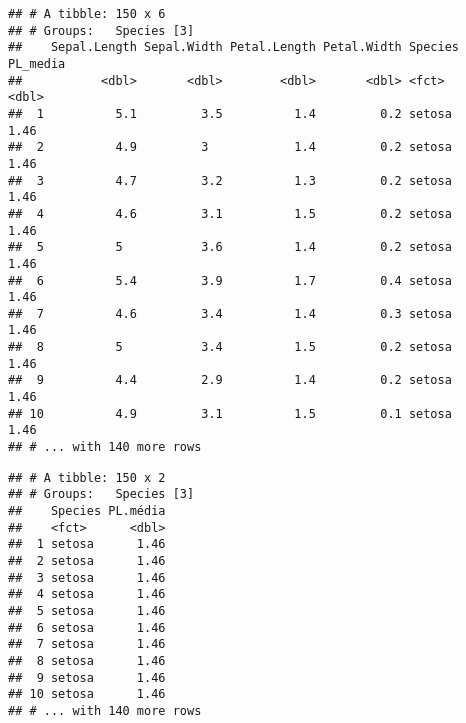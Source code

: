 \documentclass[]{book}
\newenvironment{Shaded}{\begin{snugshade}}{\end{snugshade}}
\newcommand{\DataTypeTok}[1]{\textcolor[rgb]{0.13,0.29,0.53}{#1}}
\newcommand{\KeywordTok}[1]{\textcolor[rgb]{0.13,0.29,0.53}{\textbf{#1}}}
\newcommand{\NormalTok}[1]{#1}
\newcommand{\OperatorTok}[1]{\textcolor[rgb]{0.81,0.36,0.00}{\textbf{#1}}}
\newcommand{\StringTok}[1]{\textcolor[rgb]{0.31,0.60,0.02}{#1}}
\begin{document}
\begin{Shaded}
\end{Shaded}

\begin{verbatim}
## # A tibble: 150 x 6
## # Groups:   Species [3]
##    Sepal.Length Sepal.Width Petal.Length Petal.Width Species PL_media
##           <dbl>       <dbl>        <dbl>       <dbl> <fct>      <dbl>
##  1          5.1         3.5          1.4         0.2 setosa      1.46
##  2          4.9         3            1.4         0.2 setosa      1.46
##  3          4.7         3.2          1.3         0.2 setosa      1.46
##  4          4.6         3.1          1.5         0.2 setosa      1.46
##  5          5           3.6          1.4         0.2 setosa      1.46
##  6          5.4         3.9          1.7         0.4 setosa      1.46
##  7          4.6         3.4          1.4         0.3 setosa      1.46
##  8          5           3.4          1.5         0.2 setosa      1.46
##  9          4.4         2.9          1.4         0.2 setosa      1.46
## 10          4.9         3.1          1.5         0.1 setosa      1.46
## # ... with 140 more rows
\end{verbatim}

\begin{Shaded}
\end{Shaded}

\begin{verbatim}
## # A tibble: 150 x 2
## # Groups:   Species [3]
##    Species PL.média
##    <fct>      <dbl>
##  1 setosa      1.46
##  2 setosa      1.46
##  3 setosa      1.46
##  4 setosa      1.46
##  5 setosa      1.46
##  6 setosa      1.46
##  7 setosa      1.46
##  8 setosa      1.46
##  9 setosa      1.46
## 10 setosa      1.46
## # ... with 140 more rows
\end{verbatim}
\end{document}
